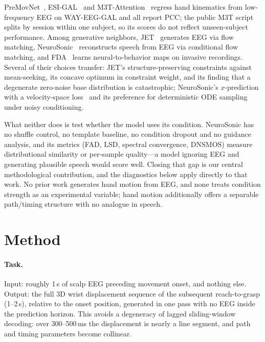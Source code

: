 \documentclass[11pt]{article}
\begin{document}
PreMovNet~\cite{premovnet}, ESI-GAL~\cite{esigal} and M3T-Attention~\cite{m3t} regress hand kinematics from low-frequency EEG on WAY-EEG-GAL and all report PCC; the public M3T script splits by session within one subject, so its scores do not reflect unseen-subject performance. Among generative neighbors, JET~\cite{jet} generates EEG via flow matching, NeuroSonic~\cite{neurosonic} reconstructs speech from EEG via conditional flow matching, and FDA~\cite{fda} learns neural-to-behavior maps on invasive recordings. Several of their choices transfer: JET's structure-preserving constraints against mean-seeking, its concave optimum in constraint weight, and its finding that a degenerate zero-noise base distribution is catastrophic; NeuroSonic's $x$-prediction with a velocity-space loss~\cite{jit} and its preference for deterministic ODE sampling under noisy conditioning.

What neither does is test whether the model uses its condition. NeuroSonic has no shuffle control, no template baseline, no condition dropout and no guidance analysis, and its metrics (FAD, LSD, spectral convergence, DNSMOS) measure distributional similarity or per-sample quality---a model ignoring EEG and generating plausible speech would score well. Closing that gap is our central methodological contribution, and the diagnostics below apply directly to that work. No prior work generates hand motion from EEG, and none treats condition strength as an experimental variable; hand motion additionally offers a separable path/timing structure with no analogue in speech.

\section{Method}

\paragraph{Task.} Input: roughly 1\,s of scalp EEG preceding movement onset, and nothing else. Output: the full 3D wrist displacement sequence of the subsequent reach-to-grasp (1--2\,s), relative to the onset position, generated in one pass with no EEG inside the prediction horizon. This avoids a degeneracy of lagged sliding-window decoding: over 300--500\,ms the displacement is nearly a line segment, and path and timing parameters become collinear.
\end{document}
